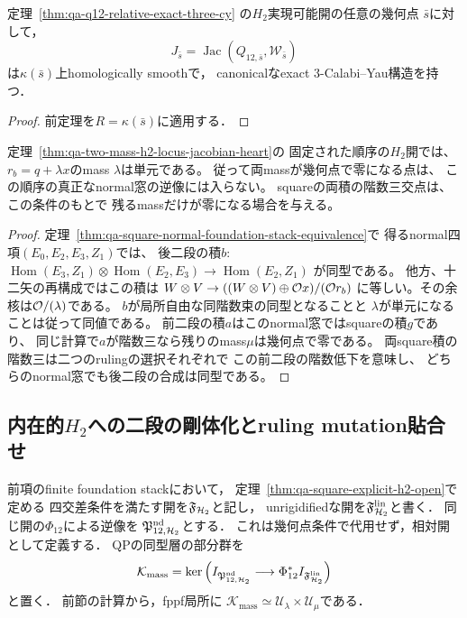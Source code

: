 \begin{corollary}
\label{cor:qa-q12-h2-geometric-exact-three-cy}
定理~\ref{thm:qa-q12-relative-exact-three-cy}
の$H_2$実現可能開の任意の幾何点
$\bar s$に対して，
\[
 J_{\bar s}=\operatorname{Jac}
 (Q_{12,\bar s},\mathcal W_{\bar s})
\]
は$\kappa(\bar s)$上homologically smoothで，
canonicalなexact $3$-Calabi--Yau構造を持つ．
\end{corollary}
\begin{proof}
前定理を$R=\kappa(\bar s)$に適用する．
\end{proof}

\begin{corollary}[二mass表示の真正なnormal窓での単元条件]
\label{cor:qa-q12-h2-normal-one-mass-unit}
定理~\ref{thm:qa-two-mass-h2-locus-jacobian-heart}の
固定された順序の$H_2$開では、$r_b=q+\lambda x$のmass
$\lambda$は単元である。
従って両massが幾何点で零になる点は、
この順序の真正なnormal窓の逆像には入らない。
squareの両積の階数三交点は、この条件のもとで
残るmassだけが零になる場合を与える。
\end{corollary}
\begin{proof}
定理~\ref{thm:qa-square-normal-foundation-stack-equivalence}で
得るnormal四項$(E_0,E_2,E_3,Z_1)$では、
後二段の積$b$: $\operatorname{Hom}(E_3,Z_1)\otimes
\operatorname{Hom}(E_2,E_3)\to\operatorname{Hom}(E_2,Z_1)$
が同型である。
他方、十二矢の再構成ではこの積は
$W\otimes V\to((W\otimes V)\oplus\mathcal O x)/(\mathcal O r_b)$
に等しい。その余核は$\mathcal O/(\lambda)$である。
$b$が局所自由な同階数束の同型となることと
$\lambda$が単元になることは従って同値である。
前二段の積$a$はこのnormal窓ではsquareの積$g$であり、
同じ計算で$a$が階数三なら残りのmass$\mu$は幾何点で零である。
両square積の階数三は二つのrulingの選択それぞれで
この前二段の階数低下を意味し、
どちらのnormal窓でも後二段の合成は同型である。
\end{proof}

\subsection{内在的\texorpdfstring{$H_2$}{H2}への二段の剛体化とruling mutation貼合せ}
\label{subsec:qa-two-mass-rigidification-ruling-glue}

前項のfinite foundation stackにおいて，
定理~\ref{thm:qa-square-explicit-h2-open}で定める
四交差条件を満たす開を$\mathfrak F_{\mathcal H_2}$と記し，
unrigidifiedな開を$\mathfrak F_{\mathcal H_2}^{\mathrm{lin}}$と書く．
同じ開の$\Phi_{12}$による逆像を
$\mathfrak P_{12,\mathcal H_2}^{\mathrm{nd}}$とする．
これは幾何点条件で代用せず，相対開として定義する．
QPの同型層の部分群を
\[
 \mathcal K_{\mathrm{mass}}
 =\ker\left(
    I_{\mathfrak P_{12,\mathcal H_2}^{\mathrm{nd}}}
      \longrightarrow\Phi_{12}^*I_{\mathfrak F_{\mathcal H_2}^{\mathrm{lin}}}
       \right)
\]
と置く．
前節の計算から，fppf局所に
$\mathcal K_{\mathrm{mass}}\simeq
 \mathcal U_\lambda\times\mathcal U_\mu$である．

